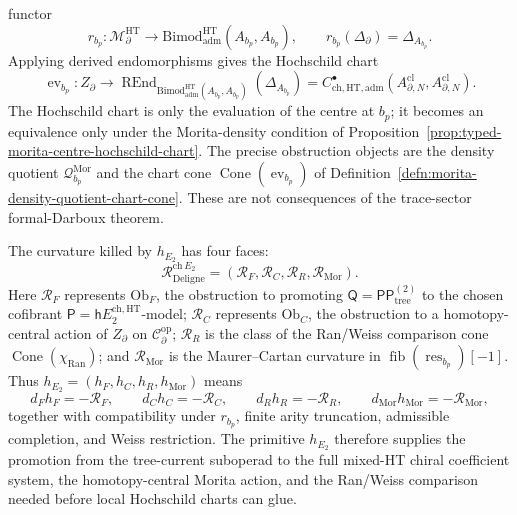 \begin{defn}
\begin{enumerate}[label=\textup{(D\arabic*)}]
    functor
    \[
      r_{b_p}\colon
      \mathcal M^{\mathrm{HT}}_\partial
      \longrightarrow
      \mathrm{Bimod}^{\mathrm{HT}}_{\mathrm{adm}}
      (A_{b_p},A_{b_p}),
      \qquad
      r_{b_p}(\Delta_\partial)=\Delta_{A_{b_p}} .
    \]
    Applying derived endomorphisms gives the Hochschild chart
    \[
      \operatorname{ev}_{b_p}\colon
      Z_\partial
      \longrightarrow
      \operatorname{REnd}_{\mathrm{Bimod}^{\mathrm{HT}}_{\mathrm{adm}}
      (A_{b_p},A_{b_p})}(\Delta_{A_{b_p}})
      =
      C^\bullet_{\mathrm{ch},\mathrm{HT},\mathrm{adm}}
      (A^{\mathrm{cl}}_{\partial,N},A^{\mathrm{cl}}_{\partial,N}).
    \]
    The Hochschild chart is only the evaluation of the centre at
    \(b_p\); it becomes an equivalence only under the Morita-density
    condition of
    Proposition~\ref{prop:typed-morita-centre-hochschild-chart}.  The
    precise obstruction objects are the density quotient
    \(\mathcal Q_{b_p}^{\mathrm{Mor}}\) and the chart cone
    \(\operatorname{Cone}(\operatorname{ev}_{b_p})\) of
    Definition~\ref{defn:morita-density-quotient-chart-cone}.  These
    are not consequences of the trace-sector formal-Darboux theorem.

    The curvature killed by \(h_{E_2}\) has four faces:
    \[
      \mathcal R^{\mathrm{ch}\,E_2}_{\mathrm{Deligne}}
      =
      (\mathcal R_F,\mathcal R_C,\mathcal R_R,\mathcal R_{\mathrm{Mor}}).
    \]
    Here \(\mathcal R_F\) represents \(\mathrm{Ob}_F\), the obstruction
    to promoting \(\mathsf Q=\mathsf{PP}^{(2)}_{\mathrm{tree}}\) to the
    chosen cofibrant
    \(\mathsf P=\mathsf hE_2^{\mathrm{ch},\mathrm{HT}}\)-model;
    \(\mathcal R_C\) represents \(\mathrm{Ob}_C\), the obstruction to a
    homotopy-central action of \(Z_\partial\) on
    \(\mathcal C^{\mathrm{op}}_\partial\);
    \(\mathcal R_R\) is the class of the Ran/Weiss comparison cone
    \(\operatorname{Cone}(\chi_{\mathrm{Ran}})\); and
    \(\mathcal R_{\mathrm{Mor}}\) is the Maurer--Cartan curvature in
    \(\operatorname{fib}(\operatorname{res}_{b_p})[-1]\).  Thus
    \(h_{E_2}=(h_F,h_C,h_R,h_{\mathrm{Mor}})\) means
    \[
      d_F h_F=-\mathcal R_F,\qquad
      d_C h_C=-\mathcal R_C,\qquad
      d_R h_R=-\mathcal R_R,\qquad
      d_{\mathrm{Mor}} h_{\mathrm{Mor}}=-\mathcal R_{\mathrm{Mor}},
    \]
    together with compatibility under \(r_{b_p}\), finite arity
    truncation, admissible completion, and Weiss restriction.  The
    primitive \(h_{E_2}\) therefore supplies the promotion from the
    tree-current suboperad to the full mixed-HT chiral coefficient
    system, the homotopy-central Morita action, and the Ran/Weiss
    comparison needed before local Hochschild charts can glue.


\end{enumerate}
\end{defn}
